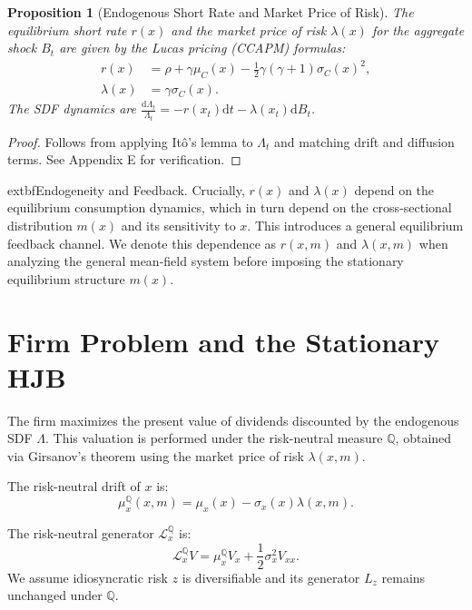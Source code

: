 \documentclass[11pt,letterpaper,oneside]{article}
\newtheorem{propositionT}{Proposition}
\newenvironment{proposition}[2]{\begin{propositionT}[#1]\label{prop:#2}}{\end{propositionT}}
\newcommand{\diff}{\mathrm{d}}
\newcommand{\LxQ}{\mathcal{L}_x^{\mathbb{Q}}}
\newcommand{\muxQ}{\mu_x^{\mathbb{Q}}}
\begin{document}
\begin{proposition}{Endogenous Short Rate and Market Price of Risk}{pricing}
The equilibrium short rate $r(x)$ and the market price of risk $\lambda(x)$ for the aggregate shock $B_t$ are given by the Lucas pricing (CCAPM) formulas:
\begin{align*}
r(x) &= \rho + \gamma \mu_C(x) - \frac{1}{2}\gamma(\gamma+1)\sigma_C(x)^2, \\
\lambda(x) &= \gamma \sigma_C(x).
\end{align*}
The SDF dynamics are $\frac{\diff\Lambda_t}{\Lambda_t} = -r(x_t)\diff t - \lambda(x_t)\diff B_t$.
\end{proposition}
\begin{proof}
Follows from applying Itô's lemma to $\Lambda_t$ and matching drift and diffusion terms. See Appendix E for verification.
\end{proof}

\begin{tcolorbox}[didacticstyle]
      extbf{Endogeneity and Feedback.} Crucially, $r(x)$ and $\lambda(x)$ depend on the equilibrium consumption dynamics, which in turn depend on the cross-sectional distribution $m(x)$ and its sensitivity to $x$. This introduces a general equilibrium feedback channel. We denote this dependence as $r(x,m)$ and $\lambda(x,m)$ when analyzing the general mean-field system before imposing the stationary equilibrium structure $m(x)$.
\end{tcolorbox}

\section{Firm Problem and the Stationary HJB}

The firm maximizes the present value of dividends discounted by the endogenous SDF $\Lambda$. This valuation is performed under the risk-neutral measure $\mathbb{Q}$, obtained via Girsanov's theorem using the market price of risk $\lambda(x,m)$.

The risk-neutral drift of $x$ is:
\begin{equation}\label{eq:muxQ}
\muxQ(x,m) = \mu_x(x) - \sigma_x(x)\lambda(x,m).
\end{equation}

The risk-neutral generator $\LxQ$ is:
\begin{equation}\label{eq:LxQ}
\LxQ V = \muxQ V_x + \frac{1}{2}\sigma_x^2 V_{xx}.
\end{equation}
We assume idiosyncratic risk $z$ is diversifiable and its generator $L_z$ remains unchanged under $\mathbb{Q}$.
\end{document}
